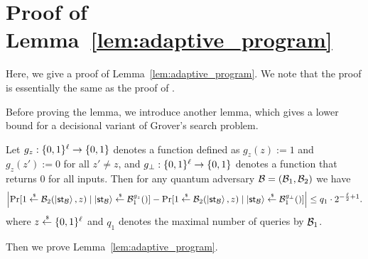 \section{Proof of Lemma~\ref{lem:adaptive_program}}\label{sec:proof_adaptive_program}
Here, we give a proof of Lemma~\ref{lem:adaptive_program}.
We note that the proof is essentially the same as the proof of \cite[Lemma 2.2]{EC:SaiXagYam18}.

Before proving the lemma, we introduce another lemma, which gives a lower bound for a decisional variant of Grover's search problem. 

\begin{lemma} \label{lem:Decision_Grover}
Let $g_z:\{0,1\}^\ell \rightarrow \{0,1\}$ denotes a function defined as $g_{z}(z):=1$ and $g_z(z'):=0$ for all $z'\not=z$, and $g_{\bot}:\{0,1\}^\ell \rightarrow \{0,1\}$ denotes a function that returns $0$ for all inputs. Then for any quantum adversary $\mathcal{B}=(\mathcal{B}_1,\mathcal{B}_2)$ we have 
\[
\left|\Pr[1\overset{\hspace{0.1em}\mathsf{\scriptscriptstyle\$}}{\leftarrow}\mathcal{B}_2(\ket{\mathsf{st}_{\mathcal{B}}},z) \mid \ket{\mathsf{st}_{\mathcal{B}}}\overset{\hspace{0.1em}\mathsf{\scriptscriptstyle\$}}{\leftarrow} \mathcal{B}_1^{g_z}()]- \Pr[1\overset{\hspace{0.1em}\mathsf{\scriptscriptstyle\$}}{\leftarrow}\mathcal{B}_2(\ket{\mathsf{st}_{\mathcal{B}}},z) \mid \ket{\mathsf{st}_{\mathcal{B}}}\overset{\hspace{0.1em}\mathsf{\scriptscriptstyle\$}}{\leftarrow} \mathcal{B}_1^{g_{\bot}}()] \right|\leq q_1 \cdot2^{-\frac{\ell}{2}+1}.
\]
where $z\overset{\hspace{0.1em}\mathsf{\scriptscriptstyle\$}}{\leftarrow} \{0,1\}^{\ell}$ and $q_1$ denotes the maximal number of queries by $\mathcal{B}_1$.
\end{lemma}

Then we prove Lemma~\ref{lem:adaptive_program}.

